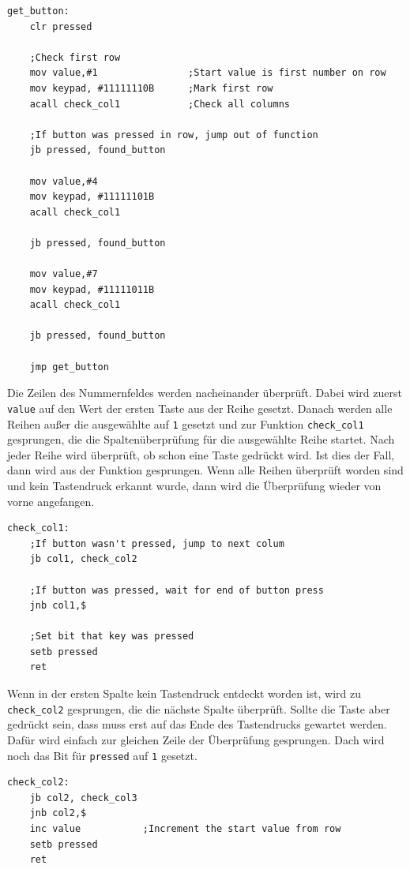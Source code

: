 \begin{lstlisting}
get_button:
    clr pressed

    ;Check first row
    mov value,#1                ;Start value is first number on row
    mov keypad, #11111110B      ;Mark first row
    acall check_col1            ;Check all columns 

    ;If button was pressed in row, jump out of function
    jb pressed, found_button    
 
    mov value,#4
    mov keypad, #11111101B
    acall check_col1
 
    jb pressed, found_button
 
    mov value,#7
    mov keypad, #11111011B
    acall check_col1
 
    jb pressed, found_button

    jmp get_button
\end{lstlisting}

Die Zeilen des Nummernfeldes werden nacheinander überprüft. Dabei wird zuerst \texttt{value} auf
den Wert der ersten Taste aus der Reihe gesetzt. Danach werden alle Reihen außer die ausgewählte auf
\texttt{1} gesetzt und zur Funktion \texttt{check_col1} gesprungen, die die Spaltenüberprüfung
für die ausgewählte Reihe startet. Nach jeder Reihe wird überprüft, ob schon eine Taste gedrückt
wird. Ist dies der Fall, dann wird aus der Funktion gesprungen. Wenn alle Reihen überprüft worden
sind und kein Tastendruck erkannt wurde, dann wird die Überprüfung wieder von vorne angefangen.

\begin{lstlisting}
check_col1:
    ;If button wasn't pressed, jump to next colum
    jb col1, check_col2

    ;If button was pressed, wait for end of button press
    jnb col1,$

    ;Set bit that key was pressed
    setb pressed
    ret
\end{lstlisting}

Wenn in der ersten Spalte kein Tastendruck entdeckt worden ist, wird zu \texttt{check_col2}
gesprungen, die die nächste Spalte überprüft. Sollte die Taste aber gedrückt sein, dass muss erst
auf das Ende des Tastendrucks gewartet werden. Dafür wird einfach zur gleichen Zeile der Überprüfung
gesprungen. Dach wird noch das Bit für \texttt{pressed} auf \texttt{1} gesetzt.

\begin{lstlisting}
check_col2:
    jb col2, check_col3
    jnb col2,$
    inc value           ;Increment the start value from row
    setb pressed
    ret
\end{lstlisting}

